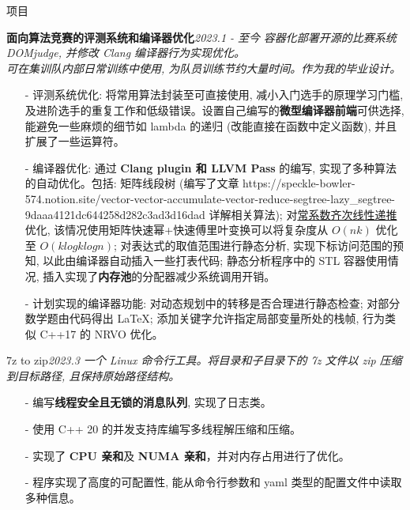 \documentclass{resume} %
\begin{document}
\begin{rSection}{项目}

\begin{rSubsection}
    {\textbf{面向算法竞赛的评测系统和编译器优化}}{\em 2023.1 - 至今}
    {\textit{容器化部署开源的比赛系统 DOMjudge, 并修改 Clang 编译器行为实现优化。}\\}
    {\textit{可在集训队内部日常训练中使用, 为队员训练节约大量时间。作为我的毕业设计。}}
    \item[]
    \begin{itemize}
        \setlength\itemsep{-0.5em}
        \item[-] 评测系统优化: 将常用算法封装至可直接使用, 减小入门选手的原理学习门槛, 及进阶选手的重复工作和低级错误。设置自己编写的\textbf{微型编译器前端}可供选择, 能避免一些麻烦的细节如 lambda 的递归 (改能直接在函数中定义函数), 并且扩展了一些运算符。
        \item[-] 编译器优化: 通过 \textbf{Clang plugin 和 LLVM Pass} 的编写, 实现了多种算法的自动优化。包括: 矩阵线段树 (编写了文章 https://speckle-bowler-574.notion.site/vector-vector-accumulate-vector-reduce-segtree-lazy_segtree-9daaa4121dc644258d282c3ad3d16dad 详解相关算法); 对\href{https://oi-wiki.org/math/poly/linear-recurrence/}{常系数齐次线性递推}优化, 该情况使用矩阵快速幂+快速傅里叶变换可以将复杂度从 $O(nk)$ 优化至 $O(klogklogn)$; 对表达式的取值范围进行静态分析, 实现下标访问范围的预知, 以此由编译器自动插入一些打表代码; 静态分析程序中的 STL 容器使用情况, 插入实现了\textbf{内存池}的分配器减少系统调用开销。
        \item[-] 计划实现的编译器功能: 对动态规划中的转移是否合理进行静态检查; 对部分数学题由代码得出 \LaTeX; 添加关键字允许指定局部变量所处的栈帧, 行为类似 C++17 的 NRVO 优化。
    \end{itemize}
\end{rSubsection}

\begin{rSubsection}
	{7z to zip}{\em 2023.3}
	{\textit{一个 Linux 命令行工具。将目录和子目录下的 7z 文件以 zip 压缩到目标路径, 且保持原始路径结构。}}
	{\textit{}}
	\item[]
	\begin{itemize}
		\setlength\itemsep{-0.5em}
		\item[-] 编写\textbf{线程安全且无锁的消息队列}, 实现了日志类。
		\item[-] 使用 C++ 20 的并发支持库编写多线程解压缩和压缩。
		\item[-] 实现了 \textbf{CPU 亲和}及 \textbf{NUMA 亲和}，并对内存占用进行了优化。
		\item[-] 程序实现了高度的可配置性, 能从命令行参数和 yaml 类型的配置文件中读取多种信息。
	\end{itemize}
\end{rSubsection}


\end{rSection}
\end{document}
